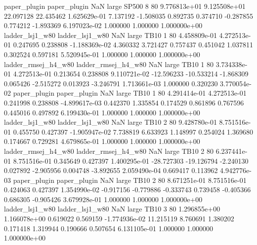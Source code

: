        paper_plugin        paper_plugin                   NaN      large    SP500                 8 80 9.776813e+01   9.125508e+01     22.097128      22.435462  1.625629e-01      7.137192     -1.508035     0.892735       0.374710 -0.287855   0.774212    -1.893369   6.197023e-02            1.000000        1.000000        1.000000e+00
    ladder_lsj1_w80     ladder_lsj1_w80                   NaN      large     TB10                 1 80 4.458809e-01   4.272513e-01      0.247695       0.238808 -1.188369e-02      4.360332      3.721427     0.757437       0.451042  1.037811   0.302524     0.597181   5.520945e-01            1.000000        1.000000        1.000000e+00
ladder_rmsej_h4_w80 ladder_rmsej_h4_w80                   NaN      large     TB10                 1 80 3.734338e-01   4.272513e-01      0.213654       0.238808  9.110721e-02    -12.596233    -10.533214    -1.868309       0.065426 -2.515272   0.013923    -3.246791   1.713661e-03            1.000000        0.320230        3.770054e-02
       paper_plugin        paper_plugin                   NaN      large     TB10                 1 80 4.291414e-01   4.272513e-01      0.241998       0.238808 -4.899617e-03      0.442370      1.335854     0.174529       0.861896  0.767596   0.445016     0.497892   6.199430e-01            1.000000        1.000000        1.000000e+00
    ladder_lsj1_w80     ladder_lsj1_w80                   NaN      large     TB10                 2 80 9.428780e-01   8.751516e-01      0.455750       0.427397 -1.905947e-02      7.738819      6.633923     1.148997       0.254024  1.369680   0.174667     0.729281   4.679865e-01            1.000000        1.000000        1.000000e+00
ladder_rmsej_h4_w80 ladder_rmsej_h4_w80                   NaN      large     TB10                 2 80 6.237441e-01   8.751516e-01      0.345649       0.427397  1.400295e-01    -28.727303    -19.126794    -2.240130       0.027892 -2.905956   0.004748    -3.892655   2.059490e-04            0.669417        0.113962        4.942776e-03
       paper_plugin        paper_plugin                   NaN      large     TB10                 2 80 8.671251e-01   8.751516e-01      0.424063       0.427397  1.354990e-02     -0.917156     -0.779886    -0.333743       0.739458 -0.405366   0.686305    -0.905426   3.679928e-01            1.000000        1.000000        1.000000e+00
    ladder_lsj1_w80     ladder_lsj1_w80                   NaN      large     TB10                 3 80 1.296855e+00   1.166078e+00      0.619022       0.569159 -1.774936e-02     11.215119      8.760691     1.380202       0.171418  1.319944   0.190666     0.507654   6.131105e-01            1.000000        1.000000        1.000000e+00
